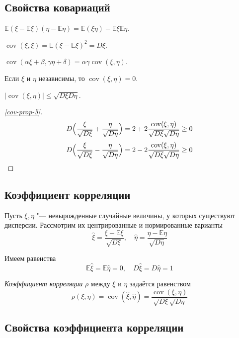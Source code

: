 \subsection{Свойства ковариаций}

\begin{props}
\item $ \mathbb E(\xi - \mathbb E\xi)(\eta - \mathbb E\eta) =
	\mathbb E(\xi\eta) - \mathbb E\xi \mathbb E \eta $.
\item $ \operatorname{cov}(\xi, \xi) = \mathbb E(\xi - \mathbb E \xi)^2 = D\xi $.
\item $ \operatorname{cov}(\alpha \xi + \beta, \gamma \eta + \delta) =
	\alpha \gamma \operatorname{cov}(\xi ,\eta) $.
\item Если $ \xi $ и $ \eta $ независимы, то $ \operatorname{cov}(\xi, \eta) = 0 $.
\item\label{cov-prop-5} $ |\operatorname{cov}(\xi, \eta)| \le \sqrt{D\xi D\eta} $.
\end{props}

\begin{proof}[\ref{cov-prop-5}]
	$$ D \Bigl( \frac\xi{\sqrt{D\xi}} + \frac\eta{\sqrt{D\eta}} \Bigr) =
	2 + 2 \frac{\operatorname{cov}(\xi, \eta)}{\sqrt{D\xi} \sqrt{D\eta}} \ge 0 $$
	$$ D \Bigl( \frac\xi{\sqrt{D\xi}} - \frac\eta{\sqrt{D\eta}} \Bigr) =
	2 - 2 \frac{\operatorname{cov}(\xi, \eta)}{\sqrt{D\xi} \sqrt{D \eta}} \ge 0 $$
\end{proof}

\subsection{Коэффициент корреляции}

Пусть $ \xi, \eta $ "--- невырожденные случайные величины, у которых существуют дисперсии.
Рассмотрим их центрированные и нормированные варианты
$$ \hat\xi = \frac{\xi - \mathbb E \xi}{\sqrt{D \xi}}, \quad \hat \eta =
\frac{\eta - \mathbb E \eta}{\sqrt{D \eta}} $$

Имеем равенства
$$ \mathbb E \hat \xi = \mathbb E \hat \eta = 0, \quad D \hat \xi = D \hat \eta = 1 $$

\begin{definition}
	\emph{Коэффициент корреляции} $ \rho $ между $ \xi $ и $ \eta $ задаётся равенством
	$$ \rho(\xi, \eta) = \operatorname{cov}(\hat \xi, \hat \eta) =
	\frac{\operatorname{cov}(\xi, \eta)}{\sqrt{D \xi} \sqrt{D \eta}} $$
\end{definition}

\subsection{Свойства коэффициента корреляции}

